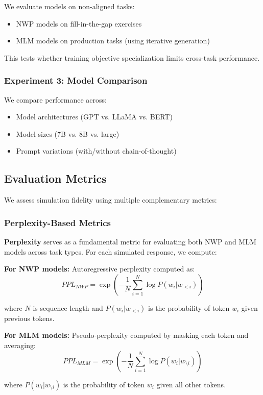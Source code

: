 We evaluate models on non-aligned tasks:
\begin{itemize}
    \item NWP models on fill-in-the-gap exercises
    \item MLM models on production tasks (using iterative generation)
\end{itemize}

This tests whether training objective specialization limits cross-task performance.

\subsubsection{Experiment 3: Model Comparison}

We compare performance across:
\begin{itemize}
    \item Model architectures (GPT vs. LLaMA vs. BERT)
    \item Model sizes (7B vs. 8B vs. large)
    \item Prompt variations (with/without chain-of-thought)
\end{itemize}

\subsection{Evaluation Metrics}

We assess simulation fidelity using multiple complementary metrics:

\subsubsection{Perplexity-Based Metrics}

\textbf{Perplexity} serves as a fundamental metric for evaluating both NWP and MLM models across task types. For each simulated response, we compute:

\textbf{For NWP models:} Autoregressive perplexity computed as:
\[PPL_{NWP} = \exp\left(-\frac{1}{N}\sum_{i=1}^{N} \log P(w_i | w_{<i})\right)\]

where $N$ is sequence length and $P(w_i | w_{<i})$ is the probability of token $w_i$ given previous tokens.

\textbf{For MLM models:} Pseudo-perplexity computed by masking each token and averaging:
\[PPL_{MLM} = \exp\left(-\frac{1}{N}\sum_{i=1}^{N} \log P(w_i | w_{\setminus i})\right)\]

where $P(w_i | w_{\setminus i})$ is the probability of token $w_i$ given all other tokens.

